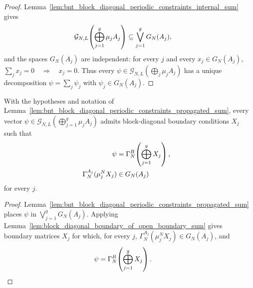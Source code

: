 \begin{proof}
    \leanok
    Lemma~\ref{lem:bnt_block_diagonal_periodic_constraints_internal_sum} gives
    \begin{align}
        \mathcal G_{N,L}\!\left(\bigoplus_{j=1}^g\mu_jA_j\right)
         & \subseteq\bigvee_{j=1}^gG_N(A_j),
        \notag
    \end{align}
    and the spaces $G_N(A_j)$ are independent: for every $j$ and every
    $x_j\in G_N(A_j)$,
    $\sum_jx_j=0 \quad\Longrightarrow\quad x_j=0$.
    Thus every $\psi\in\mathcal G_{N,L}(\bigoplus_j\mu_jA_j)$ has a unique
    decomposition $\psi=\sum_j\psi_j$ with $\psi_j\in G_N(A_j)$.
\end{proof}

\begin{lemma}
    \label{lem:bnt_block_diagonal_open_boundary_matrices}
    \leanok
    With the hypotheses and notation of
    Lemma~\ref{lem:bnt_block_diagonal_periodic_constraints_propagated_sum},
    every vector
    $\psi\in\mathcal G_{N,L}(\bigoplus_{j=1}^g\mu_jA_j)$ admits block-diagonal
    boundary conditions $X_j$ such that
    \begin{align}
        \psi
         & =\Gamma_N^B\!\left(\bigoplus_{j=1}^gX_j\right),
        \notag                                             \\
        \Gamma_N^{A_j}(\mu_j^NX_j)
         & \in G_N(A_j)
        \notag
    \end{align}
    for every $j$.
\end{lemma}

\begin{proof}
    \leanok
    Lemma~\ref{lem:bnt_block_diagonal_periodic_constraints_propagated_sum}
    places $\psi$ in $\bigvee_{j=1}^gG_N(A_j)$. Applying
    Lemma~\ref{lem:block_diagonal_boundary_of_open_boundary_sum} gives
    boundary matrices $X_j$ for which, for every $j$,
    $\Gamma_N^{A_j}(\mu_j^NX_j)\in G_N(A_j)$, and
    \begin{align}
        \psi
         & =\Gamma_N^B\!\left(\bigoplus_{j=1}^gX_j\right).
        \notag
    \end{align}
\end{proof}

